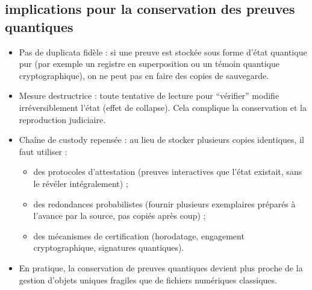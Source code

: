 \documentclass[12pt,a4paper]{article}
\begin{document}
	 \subsection{implications pour la conservation des preuves quantiques}
	 \begin{itemize}
	 	\item Pas de duplicata fidèle : si une preuve est stockée sous forme d’état quantique pur (par exemple un registre en superposition ou un témoin quantique cryptographique), on ne peut pas en faire des copies de sauvegarde.
	 	\item Mesure destructrice : toute tentative de lecture pour “vérifier” modifie irréversiblement l’état (effet de collapse). Cela complique la conservation et la reproduction judiciaire.
	 	\item Chaîne de custody repensée : au lieu de stocker plusieurs copies identiques, il faut utiliser :
	 			\begin{itemize}
	 				\item des protocoles d’attestation (preuves interactives que l’état existait, sans le révéler intégralement) ;
	 				\item des redondances probabilistes (fournir plusieurs exemplaires préparés à l’avance par la source, pas copiés après coup) ;
	 				\item des mécanismes de certification (horodatage, engagement cryptographique, signatures quantiques).
	 			\end{itemize}
	 	\item En pratique, la conservation de preuves quantiques devient plus proche de la gestion d’objets uniques fragiles que de fichiers numériques classiques.
	 \end{itemize}
\end{document}
